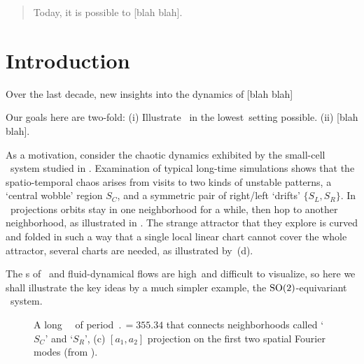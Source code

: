 \documentclass[aip,cha,
reprint,
secnumarabic,
nofootinbib, tightenlines,
nobibnotes, showkeys, showpacs,
groupedaddress,
]{revtex4-1}
\begin{document}
\maketitle



    \begin{quotation}
Today, it is possible to  [blah blah].
    \end{quotation}

\section{Introduction}
\label{s:intro}

Over the last decade, new insights into the dynamics of  [blah blah]

Our goals here are two-fold:
(i)  Illustrate \mslices\ in the lowest\dmn\ setting possible.
(ii) [blah blah].

As a motivation, consider the chaotic dynamics exhibited by the
small-cell \KS\ system studied in . Examination of
typical long-time simulations shows that the spatio-temporal chaos arises
from visits to two kinds of unstable patterns, a `central wobble' region
$S_C$, and a symmetric pair of right/left `drifts' $\{S_L,S_R\}$. In
\statesp\ projections orbits stay in one neighborhood for a while, then
hop to another neighborhood, as illustrated in . The
strange attractor that they explore is curved and folded in such a way
that a single local linear chart cannot cover the whole attractor,
several charts are needed, as illustrated by \,(d).

The \statesp s of \KS\ and fluid-dynamical flows are high\dmn\ and
difficult to visualize, so here we shall illustrate the key ideas by a
much simpler example, the $\textrm{SO}(2)$-equivariant  \twoMode\ system.

\begin{figure} %
    \centering
\caption[]{
A long \KS\ \po\ of period $\period{}=355.34$ that connects
neighborhoods called `$S_C$' and `$S_R$',
(c) $[a_1,a_2]$  projection on the first two spatial Fourier modes
(from ).
      }
\label{f:antlong}
\end{figure}
\end{document}
